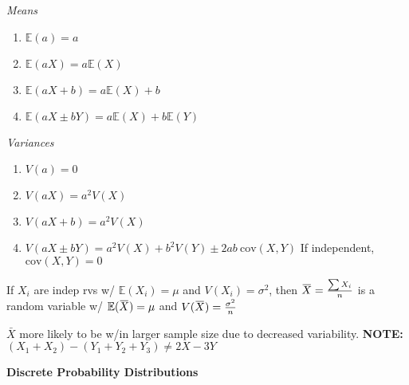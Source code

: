\documentclass[twocolumn]{article}
\newcommand{\overbar}[1]{\mkern 1.5mu\overline{\mkern-1.5mu#1\mkern-1.5mu}\mkern 1.5mu}
\begin{document}
\vspace{-.5em}
\begin{multicols}{2}
    \textit{Means} \vspace{-.5em}
    \begin{enumerate}
        \item $\mathbb{E}(a) = a$
        \item $\mathbb{E}(aX) = a \mathbb{E}(X)$
        \item $\mathbb{E}(aX + b) = a\mathbb{E}(X) + b$
        \item $\mathbb{E}(aX \pm bY) = a\mathbb{E}(X) + b \mathbb{E}(Y)$
    \end{enumerate} \vspace{1em}

    \textit{Variances} \vspace{-.5em}
    \begin{enumerate}
        \item $V(a) = 0$
        \item $V(aX) = a^2 V(X)$
        \item $V(aX + b) = a^2 V(X)$
        \item $V(aX \pm bY) = a^2 V(X) + b^2 V(Y) \pm 2ab\ \text{cov}(X, Y)$
        \subitem If independent, $\text{cov}(X, Y) = 0$
    \end{enumerate}
\end{multicols} \vspace{-.5em}

If $X_i$ are indep rvs w/ $\mathbb{E}(X_i) = \mu$ and $V(X_i) = \sigma^2$, then $\overbar{X} = \frac{\sum X_i}{n}$ is a random variable w/ $\mathbb{E}(\overbar{X}) = \mu$ and $V(\overbar{X}) = \frac{\sigma^2}{n}$

$\bar{X}$ more likely to be w/in larger sample size due to decreased variability. \hfill \textbf{NOTE:} $(X_1 + X_2) - (Y_1 + Y_2 + Y_3) \neq 2X - 3Y$

\vspace{-.5em}
\dotfill

\textbf{Discrete Probability Distributions}
\end{document}

